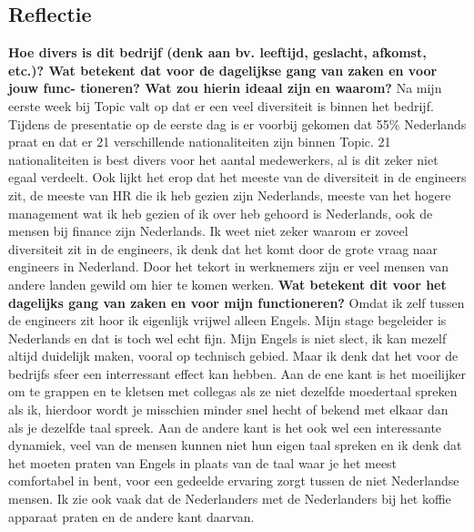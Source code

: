 \documentclass[a4paper,12pt]{article}
\begin{document}
\newpage

\subsection*{Reflectie}
\noindent\textbf{Hoe divers is dit bedrijf (denk aan bv. leeftijd, geslacht, afkomst, etc.)?
Wat betekent dat voor de dagelijkse gang van zaken en voor jouw func-
tioneren? Wat zou hierin ideaal zijn en waarom?}
\newline\newline
Na mijn eerste week bij Topic valt op dat er een veel diversiteit is binnen het bedrijf.
Tijdens de presentatie op de eerste dag is er voorbij gekomen dat 55\% Nederlands praat en dat er 21 verschillende nationaliteiten zijn binnen Topic.
21 nationaliteiten is best divers voor het aantal medewerkers, al is dit zeker niet egaal verdeelt.
Ook lijkt het erop dat het meeste van de diversiteit in de engineers zit, de meeste van HR die ik heb gezien zijn Nederlands, meeste van het hogere management wat ik heb gezien of ik over heb gehoord is Nederlands, ook de mensen bij finance zijn Nederlands.
Ik weet niet zeker waarom er zoveel diversiteit zit in de engineers, ik denk dat het komt door de grote vraag naar engineers in Nederland.
Door het tekort in werknemers zijn er veel mensen van andere landen gewild om hier te komen werken.
\newline\newline
\noindent\textbf{Wat betekent dit voor het dagelijks gang van zaken en voor mijn functioneren?}
Omdat ik zelf tussen de engineers zit hoor ik eigenlijk vrijwel alleen Engels.
Mijn stage begeleider is Nederlands en dat is toch wel echt fijn.
Mijn Engels is niet slect, ik kan mezelf altijd duidelijk maken, vooral op technisch gebied.
Maar ik denk dat het voor de bedrijfs sfeer een interressant effect kan hebben.
Aan de ene kant is het moeilijker om te grappen en te kletsen met collegas als ze niet dezelfde moedertaal spreken als ik, hierdoor wordt je misschien minder snel hecht of bekend met elkaar dan als je dezelfde taal spreek.
Aan de andere kant is het ook wel een interessante dynamiek, veel van de mensen kunnen niet hun eigen taal spreken en ik denk dat het moeten praten van Engels in plaats van de taal waar je het meest comfortabel in bent, voor een gedeelde ervaring zorgt tussen de niet Nederlandse mensen.
Ik zie ook vaak dat de Nederlanders met de Nederlanders bij het koffie apparaat praten en de andere kant daarvan.
\end{document}
